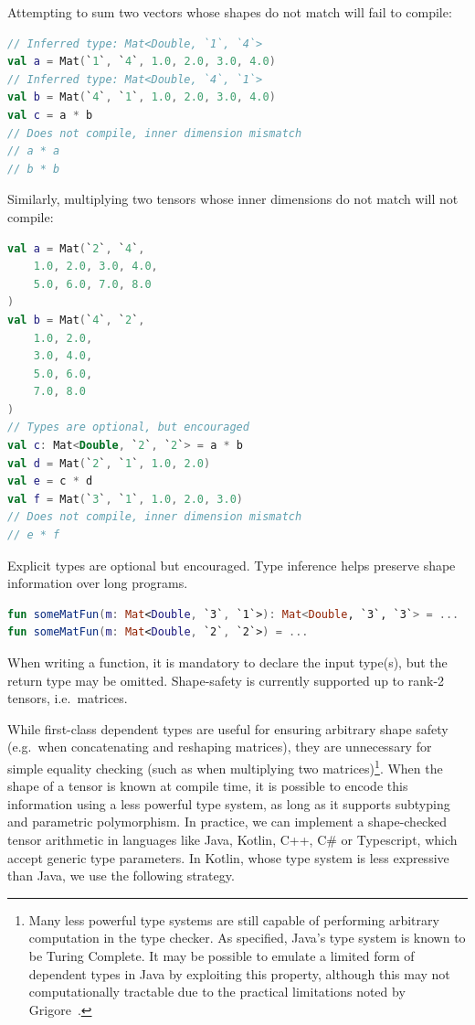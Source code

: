 \documentclass[12pt,initial,twoside,maitrise]{dms}
\numberwithin{equation}{section}
\numberwithin{table}{chapter}
\numberwithin{figure}{chapter}
\begin{document}
\noindent Attempting to sum two vectors whose shapes do not match will fail to compile:

\begin{lstlisting}[language=Kotlin]
// Inferred type: Mat<Double, `1`, `4`>
val a = Mat(`1`, `4`, 1.0, 2.0, 3.0, 4.0)
// Inferred type: Mat<Double, `4`, `1`>
val b = Mat(`4`, `1`, 1.0, 2.0, 3.0, 4.0)
val c = a * b
// Does not compile, inner dimension mismatch
// a * a
// b * b
\end{lstlisting}

\noindent Similarly, multiplying two tensors whose inner dimensions do not match will not compile:

\begin{lstlisting}[language=Kotlin]
val a = Mat(`2`, `4`,
    1.0, 2.0, 3.0, 4.0,
    5.0, 6.0, 7.0, 8.0
)
val b = Mat(`4`, `2`,
    1.0, 2.0,
    3.0, 4.0,
    5.0, 6.0,
    7.0, 8.0
)
// Types are optional, but encouraged
val c: Mat<Double, `2`, `2`> = a * b
val d = Mat(`2`, `1`, 1.0, 2.0)
val e = c * d
val f = Mat(`3`, `1`, 1.0, 2.0, 3.0)
// Does not compile, inner dimension mismatch
// e * f
\end{lstlisting}

Explicit types are optional but encouraged. Type inference helps preserve shape information over long programs.

\begin{lstlisting}[language=Kotlin]
fun someMatFun(m: Mat<Double, `3`, `1`>): Mat<Double, `3`, `3`> = ...
fun someMatFun(m: Mat<Double, `2`, `2`>) = ...
\end{lstlisting}

When writing a function, it is mandatory to declare the input type(s), but the return type may be omitted. Shape-safety is currently supported up to rank-2 tensors, i.e.\ matrices.

While first-class dependent types are useful for ensuring arbitrary shape safety (e.g.\ when concatenating and reshaping matrices), they are unnecessary for simple equality checking (such as when multiplying two matrices)\footnote{Many less powerful type systems are still capable of performing arbitrary computation in the type checker. As specified, Java's type system is known to be Turing Complete. It may be possible to emulate a limited form of dependent types in Java by exploiting this property, although this may not computationally tractable due to the practical limitations noted by Grigore~\cite{Grigore:2017:JGT:3009837.3009871}.}. When the shape of a tensor is known at compile time, it is possible to encode this information using a less powerful type system, as long as it supports subtyping and parametric polymorphism. In practice, we can implement a shape-checked tensor arithmetic in languages like Java, Kotlin, C++, C\# or Typescript, which accept generic type parameters. In Kotlin, whose type system is less expressive than Java, we use the following strategy.
\end{document}
